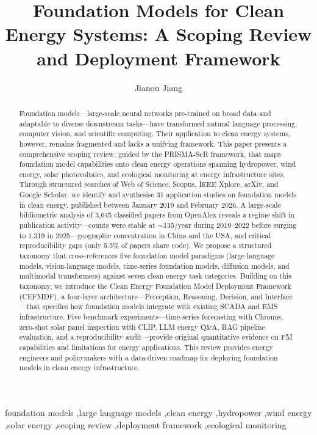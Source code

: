 \documentclass[preprint,12pt]{elsarticle}
\begin{document}
\begin{frontmatter}
\title{Foundation Models for Clean Energy Systems: A Scoping Review and Deployment Framework}

\author[ox]{Jianou Jiang}



\begin{abstract}
Foundation models---large-scale neural networks pre-trained on broad data and adaptable to diverse downstream tasks---have transformed natural language processing, computer vision, and scientific computing. Their application to clean energy systems, however, remains fragmented and lacks a unifying framework. This paper presents a comprehensive scoping review, guided by the PRISMA-ScR framework, that maps foundation model capabilities onto clean energy operations spanning hydropower, wind energy, solar photovoltaics, and ecological monitoring at energy infrastructure sites. Through structured searches of Web of Science, Scopus, IEEE Xplore, arXiv, and Google Scholar, we identify and synthesise 31 application studies on foundation models in clean energy, published between January 2019 and February 2026. A large-scale bibliometric analysis of 3{,}645 classified papers from OpenAlex reveals a regime shift in publication activity---counts were stable at ${\sim}$135/year during 2019--2022 before surging to 1{,}319 in 2025---geographic concentration in China and the USA, and critical reproducibility gaps (only 5.5\% of papers share code). We propose a structured taxonomy that cross-references five foundation model paradigms (large language models, vision-language models, time-series foundation models, diffusion models, and multimodal transformers) against seven clean energy task categories. Building on this taxonomy, we introduce the Clean Energy Foundation Model Deployment Framework (CEFMDF), a four-layer architecture---Perception, Reasoning, Decision, and Interface---that specifies how foundation models integrate with existing SCADA and EMS infrastructure. Five benchmark experiments---time-series forecasting with Chronos, zero-shot solar panel inspection with CLIP, LLM energy Q\&A, RAG pipeline evaluation, and a reproducibility audit---provide original quantitative evidence on FM capabilities and limitations for energy applications. This review provides energy engineers and policymakers with a data-driven roadmap for deploying foundation models in clean energy infrastructure.
\end{abstract}

\begin{keyword}
foundation models \sep large language models \sep clean energy \sep hydropower \sep wind energy \sep solar energy \sep scoping review \sep deployment framework \sep ecological monitoring
\end{keyword}

\end{frontmatter}
\end{document}
